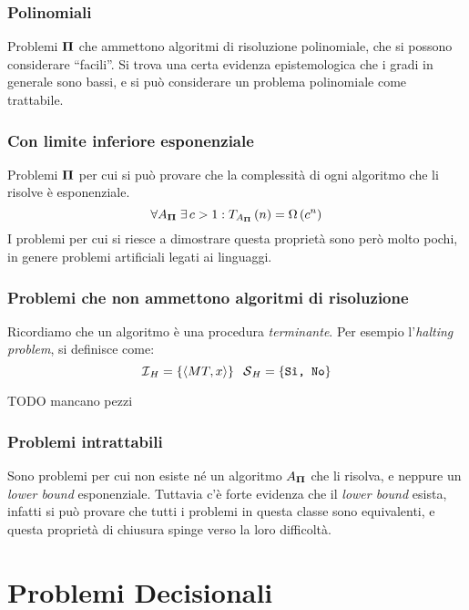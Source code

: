 \subsubsection{Polinomiali}
Problemi $\bm{\Pi}{}$ che ammettono algoritmi di risoluzione polinomiale, che si possono considerare ``facili''. Si trova una certa evidenza epistemologica che i gradi in generale sono bassi, e si può considerare un problema polinomiale come trattabile.

\subsubsection{Con limite inferiore esponenziale}
Problemi $\bm{\Pi}{}$ per cui si può provare che la complessità di ogni algoritmo che li risolve è esponenziale.
\begin{equation*}
    \forall A_{\bm{\Pi}{}} \; \exists \, c > 1 : T_{A_{\bm{\Pi}{}}} \left( n \right) = \Omega \left( c^{n} \right)
\end{equation*}
I problemi per cui si riesce a dimostrare questa proprietà sono però molto pochi, in genere problemi artificiali legati ai linguaggi.

\subsubsection{Problemi che non ammettono algoritmi di risoluzione}
Ricordiamo che un algoritmo è una procedura \emph{terminante}. Per esempio l'\emph{halting problem}, si definisce come:
\begin{equation*}
    \mathcal{I}{}_{H} = \left\{ \langle MT,x \rangle \right\}
    \;\;
    \mathcal{S}{}_{H} = \left\{ \texttt{Sì, No} \right\}
\end{equation*}

TODO mancano pezzi


\subsubsection{Problemi intrattabili}

Sono problemi per cui non esiste né un algoritmo $A_{\bm{\Pi}{}}$ che li risolva, e neppure un \emph{lower bound} esponenziale.
Tuttavia c'è forte evidenza che il \emph{lower bound} esista, infatti si può provare che tutti i problemi in questa classe sono equivalenti, e questa proprietà di chiusura spinge verso la loro difficoltà.

\section{Problemi Decisionali}

